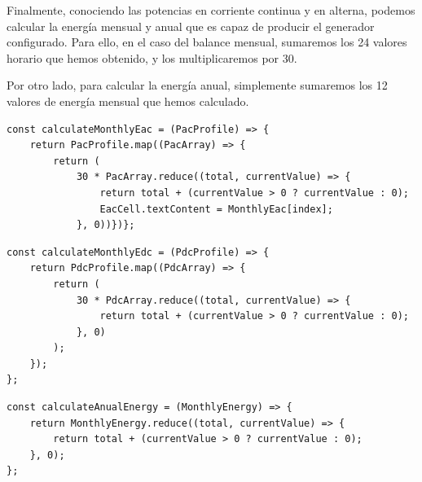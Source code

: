 \begin{enumerate}
Finalmente, conociendo las potencias en corriente continua y en alterna, podemos calcular la energía mensual y anual que es capaz de producir el generador configurado. Para ello, en el caso del balance mensual, sumaremos los 24 valores horario que hemos obtenido, y los multiplicaremos por 30. 

Por otro lado, para calcular la energía anual, simplemente sumaremos los 12 valores de energía mensual que hemos calculado.

\begin{lstlisting}[style=ES6, caption={Cálculo de la energía mensual en alterna}]
const calculateMonthlyEac = (PacProfile) => {
	return PacProfile.map((PacArray) => {
		return (
			30 * PacArray.reduce((total, currentValue) => {
				return total + (currentValue > 0 ? currentValue : 0);
				EacCell.textContent = MonthlyEac[index];
			}, 0))})};
\end{lstlisting}

\begin{lstlisting}[style=ES6, caption={Cálculo de la energía mensual en continua}]
const calculateMonthlyEdc = (PdcProfile) => {
	return PdcProfile.map((PdcArray) => {
		return (
			30 * PdcArray.reduce((total, currentValue) => {
				return total + (currentValue > 0 ? currentValue : 0);
			}, 0)
		);
	});
};
\end{lstlisting}

\begin{lstlisting}[style=ES6, caption={Cálculo de la energía anual}]
const calculateAnualEnergy = (MonthlyEnergy) => {
	return MonthlyEnergy.reduce((total, currentValue) => {
		return total + (currentValue > 0 ? currentValue : 0);
	}, 0);
};
\end{lstlisting}



\end{enumerate}
